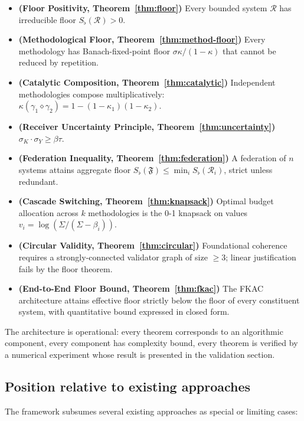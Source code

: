 \documentclass[11pt,twocolumn,a4paper]{article}
\theoremstyle{definition}
\theoremstyle{remark}
\newcommand{\Federation}{\mathfrak{F}}
\newcommand{\receiver}{\mathcal{R}}
\newcommand{\Sigmax}{\Sigma}
\newcommand{\Sfloor}{S_{\flat}}
\newcommand{\catpow}{\kappa}
\newcommand{\disp}{\sigma}
\newcommand{\Compose}{\diamond}
\begin{document}
\begin{itemize}[leftmargin=*,nosep]
\item \textbf{(Floor Positivity, Theorem~\ref{thm:floor})} Every bounded system $\receiver$ has irreducible floor $\Sfloor(\receiver) > 0$.
\item \textbf{(Methodological Floor, Theorem~\ref{thm:method-floor})} Every methodology has Banach-fixed-point floor $\disp\catpow/(1-\catpow)$ that cannot be reduced by repetition.
\item \textbf{(Catalytic Composition, Theorem~\ref{thm:catalytic})} Independent methodologies compose multiplicatively: $\catpow(\gamma_1 \Compose \gamma_2) = 1 - (1-\catpow_1)(1-\catpow_2)$.
\item \textbf{(Receiver Uncertainty Principle, Theorem~\ref{thm:uncertainty})} $\disp_K \cdot \disp_Y \geq \beta\tau$.
\item \textbf{(Federation Inequality, Theorem~\ref{thm:federation})} A federation of $n$ systems attains aggregate floor $\Sfloor(\Federation) \leq \min_i \Sfloor(\receiver_i)$, strict unless redundant.
\item \textbf{(Cascade Switching, Theorem~\ref{thm:knapsack})} Optimal budget allocation across $k$ methodologies is the 0-1 knapsack on values $v_i = \log(\Sigmax/(\Sigmax - \beta_i))$.
\item \textbf{(Circular Validity, Theorem~\ref{thm:circular})} Foundational coherence requires a strongly-connected validator graph of size $\geq 3$; linear justification fails by the floor theorem.
\item \textbf{(End-to-End Floor Bound, Theorem~\ref{thm:fkac})} The FKAC architecture attains effective floor strictly below the floor of every constituent system, with quantitative bound expressed in closed form.
\end{itemize}

The architecture is operational: every theorem corresponds to an algorithmic component, every component has complexity bound, every theorem is verified by a numerical experiment whose result is presented in the validation section.

\subsection{Position relative to existing approaches}

The framework subsumes several existing approaches as special or limiting cases:
\end{document}
